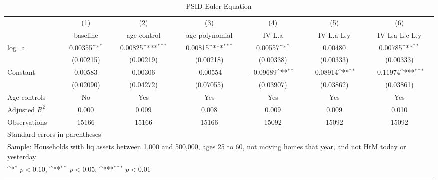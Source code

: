 {
\def\sym#1{\ifmmode^{#1}\else\(^{#1}\)\fi}
\begin{longtable}{l*{6}{c}}
\caption{PSID Euler Equation}\\
\toprule\endfirsthead\midrule\endhead\midrule\endfoot\endlastfoot
                    &\multicolumn{1}{c}{(1)}&\multicolumn{1}{c}{(2)}&\multicolumn{1}{c}{(3)}&\multicolumn{1}{c}{(4)}&\multicolumn{1}{c}{(5)}&\multicolumn{1}{c}{(6)}\\
                    &\multicolumn{1}{c}{baseline}&\multicolumn{1}{c}{age control}&\multicolumn{1}{c}{age polynomial}&\multicolumn{1}{c}{IV L.a}&\multicolumn{1}{c}{IV L.a L.y}&\multicolumn{1}{c}{IV L.a L.c L.y}\\
\midrule
log\_a               &     0.00355\sym{*}  &     0.00825\sym{***}&     0.00815\sym{***}&     0.00557\sym{*}  &     0.00480         &     0.00785\sym{**} \\
                    &   (0.00215)         &   (0.00219)         &   (0.00218)         &   (0.00338)         &   (0.00333)         &   (0.00333)         \\
\addlinespace
Constant            &     0.00583         &     0.00306         &    -0.00554         &    -0.09689\sym{**} &    -0.08914\sym{**} &    -0.11974\sym{***}\\
                    &   (0.02090)         &   (0.04272)         &   (0.07055)         &   (0.03907)         &   (0.03862)         &   (0.03861)         \\
\addlinespace
Age controls        &          No         &         Yes         &         Yes         &         Yes         &         Yes         &         Yes         \\
\midrule
Adjusted \(R^{2}\)  &       0.000         &       0.009         &       0.008         &       0.009         &       0.009         &       0.010         \\
Observations        &       15166         &       15166         &       15166         &       15092         &       15092         &       15092         \\
\bottomrule
\multicolumn{7}{l}{\footnotesize Standard errors in parentheses}\\
\multicolumn{7}{l}{\footnotesize Sample: Households with liq assets between 1,000 and 500,000, ages 25 to 60, not moving homes that year, and not HtM today or yesterday}\\
\multicolumn{7}{l}{\footnotesize \sym{*} \(p<0.10\), \sym{**} \(p<0.05\), \sym{***} \(p<0.01\)}\\
\end{longtable}
}
